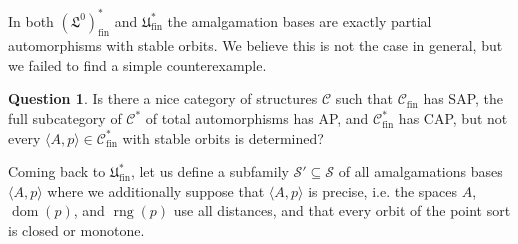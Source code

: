 \documentclass[oneside,notitlepage,12pt]{article}
\theoremstyle{definition}
\newtheorem{question}[tw]{Question}
\theoremstyle{remark}
\newcommand \seq [1]{\langle #1 \rangle}
\newcommand \dom {\operatorname{dom}}
\newcommand \rng {\operatorname{rng}}
\newcommand \Su {\mathscr{S}}
\newcommand \C {\mathscr{C}}
\newcommand \fin {{\operatorname{fin}}}
\newcommand \Lin {\mathfrak{L}}
\newcommand \Ult {\mathfrak{U}}
\begin{document}
In both $(\Lin^0)^*_\fin$ and $\Ult^*_\fin$ the amalgamation bases are exactly partial automorphisms with stable orbits.
We believe this is not the case in general, but we failed to find a simple counterexample.
\begin{question} \label{que:stable_always_works}
    Is there a nice category of structures $\C$ such that $\C_\fin$ has SAP, the full subcategory of $\C^*$ of total automorphisms has AP, and $\C^*_\fin$ has CAP, but not every $\seq{A, p} \in \C^*_\fin$ with stable orbits is determined?
\end{question}

Coming back to $\Ult^*_\fin$,
let us define a subfamily $\Su' \subseteq \Su$ of all amalgamations bases $\seq{A, p}$ where we additionally suppose that $\seq{A, p}$ is precise, i.e. the spaces $A$, $\dom(p)$, and $\rng(p)$ use all distances, and that every orbit of the point sort is closed or monotone.
\end{document}
